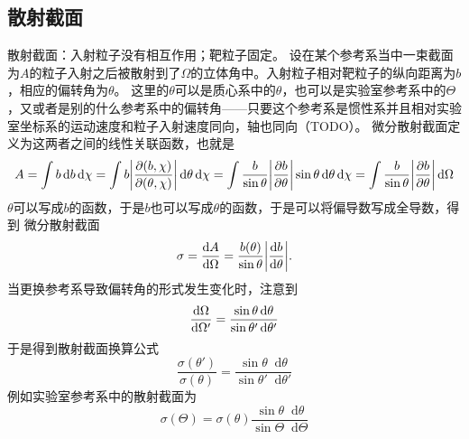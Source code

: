 \documentclass[UTF8, a4paper]{ctexart}
\renewcommand*{\dd}{\mathop{}\!\mathrm{d}}
\begin{document}
\subsection{散射截面}

散射截面：入射粒子没有相互作用；靶粒子固定。
设在某个参考系当中一束截面为$A$的粒子入射之后被散射到了$\Omega$的立体角中。入射粒子相对靶粒子的纵向距离为$b$，相应的偏转角为$\theta$。
这里的$\theta$可以是质心系中的$\theta$，也可以是实验室参考系中的$\Theta$，又或者是别的什么参考系中的偏转角——只要这个参考系是惯性系并且相对实验室坐标系的运动速度和粒子入射速度同向，轴也同向（TODO）。
微分散射截面定义为这两者之间的线性关联函数，也就是
\[
    A = \int b \dd b \dd \chi = \int b \abs{\pdv{(b, \chi)}{(\theta, \chi)}} \dd \theta \dd \chi = \int \frac{b}{\sin \theta} \abs{\pdv{b}{\theta}} \sin \theta \dd \theta \dd \chi = \int \frac{b}{\sin \theta} \abs{\pdv{b}{\theta}} \dd \Omega
\]
$\theta$可以写成$b$的函数，于是$b$也可以写成$\theta$的函数，于是可以将偏导数写成全导数，得到
微分散射截面
\begin{equation}
    \sigma = \dv{A}{\Omega} = \frac{b(\theta)}{\sin \theta} \abs{\dv{b}{\theta}}.
    \label{eq:cross-section}
\end{equation}
当更换参考系导致偏转角的形式发生变化时，注意到
\[
    \dv{\Omega}{\Omega'} = \frac{\sin \theta \dd \theta}{\sin \theta' \dd \theta'}
\]
于是得到散射截面换算公式
\begin{equation}
    \frac{\sigma(\theta')}{\sigma(\theta)} = \frac{\sin \theta \dd \theta}{\sin \theta' \dd \theta'}
\end{equation}
例如实验室参考系中的散射截面为
\begin{equation}
    \sigma(\Theta) = \sigma(\theta) \frac{\sin \theta \dd \theta}{\sin \Theta \dd \Theta}
\end{equation}
\end{document}
